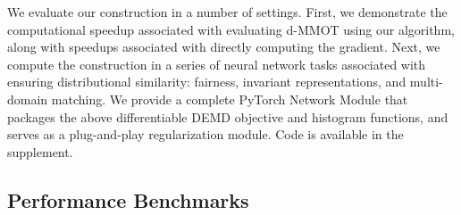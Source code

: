 We evaluate our construction in a number of settings. 
First, we demonstrate the computational speedup associated with evaluating d-MMOT using our algorithm, along with speedups associated with directly computing the gradient.
Next, we compute the construction in a series of neural network tasks associated with ensuring distributional similarity: fairness, invariant representations, and multi-domain matching.
We provide a complete PyTorch Network Module that packages the above differentiable DEMD objective and histogram functions,
and serves as a plug-and-play regularization module. Code is available in the supplement. %


\subsection{Performance Benchmarks}

